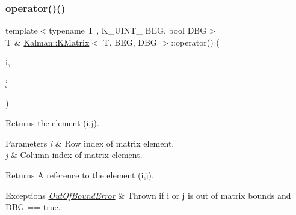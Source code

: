 \subsubsection{\texorpdfstring{operator()()}{operator()()}\hspace{0.1cm}{\footnotesize\ttfamily [1/2]}}
{\footnotesize\ttfamily template$<$typename T , K\+\_\+\+U\+I\+N\+T\+\_ B\+EG, bool D\+BG$>$ \\
T \& \mbox{\hyperlink{classKalman_1_1KMatrix}{Kalman\+::\+K\+Matrix}}$<$ T, B\+EG, D\+BG $>$\+::operator() (\begin{DoxyParamCaption}\item[{\mbox{\hyperlink{namespaceKalman_a628a50cae10f6e2035393d4f96c698bd}{K\+\_\+\+U\+I\+N\+T\+\_\+32}}}]{i,  }\item[{\mbox{\hyperlink{namespaceKalman_a628a50cae10f6e2035393d4f96c698bd}{K\+\_\+\+U\+I\+N\+T\+\_\+32}}}]{j }\end{DoxyParamCaption})\hspace{0.3cm}{\ttfamily [inline]}}



Returns the element {\ttfamily (i,j)}. 


\begin{DoxyParams}{Parameters}
{\em i} & Row index of matrix element. \\
\hline
{\em j} & Column index of matrix element. \\
\hline
\end{DoxyParams}
\begin{DoxyReturn}{Returns}
A reference to the element {\ttfamily (i,j)}. 
\end{DoxyReturn}

\begin{DoxyExceptions}{Exceptions}
{\em \mbox{\hyperlink{structKalman_1_1OutOfBoundError}{Out\+Of\+Bound\+Error}}} & Thrown if {\ttfamily i} or {\ttfamily j} is out of matrix bounds and {\ttfamily D\+BG == true}. \\
\hline
\end{DoxyExceptions}
\mbox{\label{classKalman_1_1KMatrix_a79550cd241ef83c904b12f1feda0452e}} 
